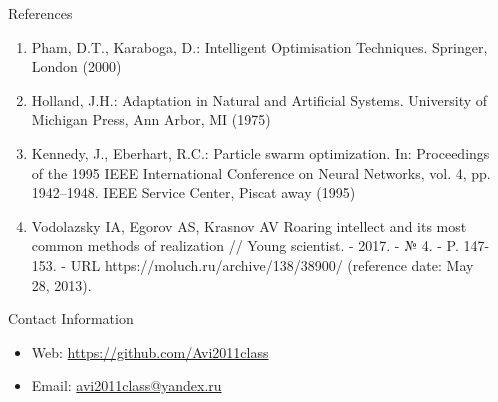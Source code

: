 \documentclass[final,hyperref]{beamer}
\begin{document}
\begin{frame}[t]
\begin{columns}[t]
\begin{column}{.465\textwidth}

\begin{block}{References}
\begin{enumerate}
	\item
		Pham, D.T., Karaboga, D.: Intelligent Optimisation Techniques. Springer, London (2000)
	\item
		Holland, J.H.: Adaptation in Natural and Artificial Systems. University of Michigan Press, Ann Arbor, MI (1975)
	\item
		Kennedy, J., Eberhart, R.C.: Particle swarm optimization. In: Proceedings of the 1995 IEEE
		International Conference on Neural Networks, vol. 4, pp. 1942–1948. IEEE Service Center,
		Piscat away (1995)
	\item
		Vodolazsky IA, Egorov AS, Krasnov AV Roaring intellect and its most common methods of 
		realization // Young scientist. - 2017. - № 4. - P. 147-153. - URL 
		https://moluch.ru/archive/138/38900/ (reference date: May 28, 2013).
	
\end{enumerate}

\end{block}




\begin{block}{Contact Information}

\begin{itemize}
\item Web: \href{https://github.com/Avi2011class}{https://github.com/Avi2011class}
\item Email: \href{mailto:avi2011class@yandex.ru}{avi2011class@yandex.ru}
\end{itemize}

\end{block}


\end{column} %

\begin{column}{.015\textwidth}\end{column} %

\end{columns} %

\end{frame} %
\end{document}
